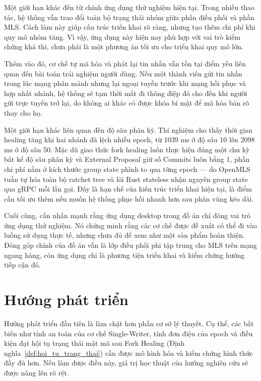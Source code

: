 \documentclass[../DoAn.tex]{subfiles}
\begin{document}
Một giới hạn khác đến từ chính ứng dụng thử nghiệm hiện tại. Trong nhiều thao tác, hệ thống vẫn trao đổi toàn bộ trạng thái nhóm giữa phần điều phối và phần MLS. Cách làm này giúp cấu trúc triển khai rõ ràng, nhưng tạo thêm chi phí khi quy mô nhóm tăng. Vì vậy, ứng dụng này hiện nay phù hợp với vai trò kiểm chứng khả thi, chưa phải là một phương án tối ưu cho triển khai quy mô lớn.

Thêm vào đó, cơ chế tự mã hóa và phát lại tin nhắn vẫn tồn tại điểm yếu liên quan đến bài toán trải nghiệm người dùng. Nếu một thành viên gửi tin nhắn trong lúc mạng phân mảnh nhưng lại ngoại tuyến trước khi mạng hồi phục và hợp nhất nhánh, hệ thống sẽ tạm thời mất đi thông điệp đó cho đến khi người gửi trực tuyến trở lại, do không ai khác có được khóa bí mật để mã hóa bản rõ thay cho họ.

Một giới hạn khác liên quan đến độ sâu phân kỳ. Thí nghiệm cho thấy thời gian healing tăng khi hai nhánh đã lệch nhiều epoch, từ 1039 ms ở độ sâu 10 lên 2098 ms ở độ sâu 50. Mặc dù giao thức fork healing luôn thực hiện đúng một chu kỳ bất kể độ sâu phân kỳ và External Proposal giữ số Commits luôn bằng 1, phần chi phí nằm ở kích thước group state phình to qua từng epoch --- do OpenMLS tuần tự hóa toàn bộ ratchet tree và lõi Rust stateless nhận nguyên group state qua gRPC mỗi lần gọi. Đây là hạn chế của kiến trúc triển khai hiện tại, là điểm cần tối ưu thêm nếu muốn hệ thống phục hồi nhanh hơn sau phân vùng kéo dài.

Cuối cùng, cần nhấn mạnh rằng ứng dụng desktop trong đồ án chỉ đóng vai trò ứng dụng thử nghiệm. Nó chứng minh rằng các cơ chế được đề xuất có thể đi vào luồng sử dụng thực tế, nhưng chưa đủ để xem như một sản phẩm hoàn thiện. Đóng góp chính của đồ án vẫn là lớp điều phối phi tập trung cho MLS trên mạng ngang hàng, còn ứng dụng chỉ là phương tiện triển khai và kiểm chứng hướng tiếp cận đó.

\section{Hướng phát triển}

Hướng phát triển đầu tiên là làm chặt hơn phần cơ sở lý thuyết. Cụ thể, các bất biến như tính an toàn của cơ chế Single-Writer, tính đơn điệu của epoch và điều kiện đạt hội tụ trạng thái mật mã sau Fork Healing (Định nghĩa~\ref{def:hoi_tu_trang_thai}) cần được mô hình hóa và kiểm chứng hình thức đầy đủ hơn. Nếu làm được điều này, giá trị học thuật của hướng nghiên cứu sẽ được nâng lên rõ rệt.
\end{document}
